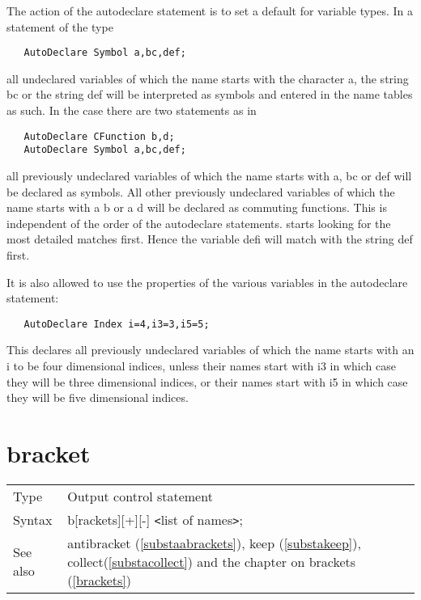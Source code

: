 
\noindent The action of the autodeclare statement is to set a default for 
variable types. In a statement of the type
\begin{verbatim}
   AutoDeclare Symbol a,bc,def;
\end{verbatim}
all undeclared variables of which the name starts with the character a, the 
string bc or the string def will be interpreted as symbols and entered in 
the name tables as such. In the case there are two statements as in
\begin{verbatim}
   AutoDeclare CFunction b,d;
   AutoDeclare Symbol a,bc,def;
\end{verbatim}
all previously undeclared variables of which the name starts with a, bc or 
def will be declared as symbols. All other previously undeclared variables 
of which the name starts with a b or a d will be declared as commuting 
functions. This is independent of the order of the autodeclare statements. 
{\FORM} starts looking for the most detailed matches 
first. Hence the variable defi will match with the string def first.
\vspace{4mm}

\noindent It is also allowed to use the properties of the various variables 
in the autodeclare statement:
\begin{verbatim}
   AutoDeclare Index i=4,i3=3,i5=5;
\end{verbatim}
This declares all previously undeclared variables of which the name starts 
with an i to be four dimensional indices, unless their names start with i3 in 
which case they will be three dimensional indices, or their names start 
with i5 in which case they will be five dimensional indices. \vspace{10mm}


\section{bracket}
\label{substabracket}

\noindent \begin{tabular}{ll}
Type & Output control statement\\
Syntax & b[rackets][+][-] {\tt<}list of names{\tt>}; \\
See also & antibracket (\ref{substaabrackets}), keep (\ref{substakeep}),
    collect(\ref{substacollect}) and the chapter on brackets 
     (\ref{brackets})
\end{tabular} \vspace{4mm}

